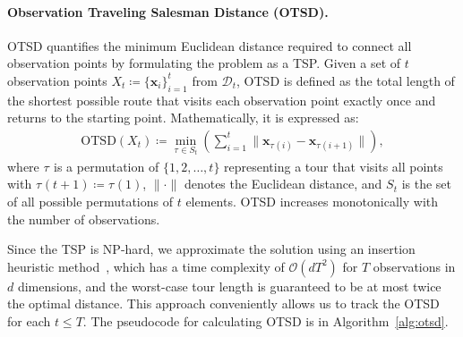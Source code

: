 \documentclass[accepted]{uai2025}
\newcommand{\perm}[1][]{\tau_{#1}}
\begin{document}
\paragraph{Observation Traveling Salesman Distance (OTSD).}
\Ac{OTSD} quantifies the minimum Euclidean distance required to connect all observation points by formulating the problem as a \ac{TSP}. 
Given a set of $t$ observation points $X_t\coloneqq\{\bm{x}_i\}_{i=1}^t$ from $\mathcal{D}_t$, \ac{OTSD} is defined as the total length of the shortest possible route that visits each observation point exactly once and returns to the starting point. 
Mathematically, it is expressed as:
\begin{equation}
\begin{aligned}
\text{OTSD}(X_t)\coloneqq \min_{\perm \in S_t} \left( \sum_{i=1}^{t} \lVert \bm{x}_{\perm(i)} - \bm{x}_{\perm(i+1)} \rVert \right),
\end{aligned}
\end{equation}
where $\perm$ is a permutation of $\{1, 2, \dots, t\}$ representing a tour that visits all points with $\perm(t+1)\coloneqq\perm(1)$, $\lVert \cdot \rVert$ denotes the Euclidean distance, and $S_t$ is the set of all possible permutations of $t$ elements. 
\ac{OTSD} increases monotonically with the number of observations.

Since the \ac{TSP} is NP-hard, we approximate the solution using an insertion heuristic method~\citep{rosenkrantz1974approximate}, which has a time complexity of $\mathcal{O}(dT^2)$ for $T$ observations in $d$ dimensions, and the worst-case tour length is guaranteed to be at most twice the optimal distance. This approach conveniently allows us to track the \ac{OTSD} for each $t \leq T$. %
The pseudocode for calculating \ac{OTSD} is in Algorithm~\ref{alg:otsd}.
\end{document}
